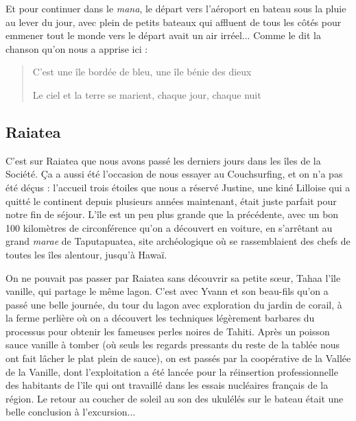 Et pour continuer dans le \emph{mana}, le départ vers l'aéroport en
bateau sous la pluie au lever du jour, avec plein de petits bateaux qui
affluent de tous les côtés pour emmener tout le monde vers le départ
avait un air irréel... Comme le dit la chanson qu'on nous a apprise ici
:

\begin{quote}
C'est une île bordée de bleu, une île bénie des dieux

Le ciel et la terre se marient, chaque jour, chaque nuit
\end{quote}

\hypertarget{raiatea}{%
\subsection{Raiatea}\label{raiatea}}

C'est sur Raiatea que nous avons passé les derniers jours dans les îles
de la Société. Ça a aussi été l'occasion de nous essayer au
Couchsurfing, et on n'a pas été déçus : l'accueil trois étoiles que nous
a réservé Justine, une kiné Lilloise qui a quitté le continent depuis
plusieurs années maintenant, était juste parfait pour notre fin de
séjour. L'île est un peu plus grande que la précédente, avec un bon 100
kilomètres de circonférence qu'on a découvert en voiture, en s'arrêtant
au grand \emph{marae} de Taputapuatea, site archéologique où se
rassemblaient des chefs de toutes les îles alentour, jusqu'à Hawaï.

On ne pouvait pas passer par Raiatea sans découvrir sa petite sœur,
Tahaa l'île vanille, qui partage le même lagon. C'est avec Yvann et son
beau-fils qu'on a passé une belle journée, du tour du lagon avec
exploration du jardin de corail, à la ferme perlière où on a découvert
les techniques légèrement barbares du processus pour obtenir les
fameuses perles noires de Tahiti. Après un poisson sauce vanille à
tomber (où seuls les regards pressants du reste de la tablée nous ont
fait lâcher le plat plein de sauce), on est passés par la coopérative de
la Vallée de la Vanille, dont l'exploitation a été lancée pour la
réinsertion professionnelle des habitants de l'île qui ont travaillé
dans les essais nucléaires français de la région. Le retour au coucher
de soleil au son des ukulélés sur le bateau était une belle conclusion à
l'excursion...

